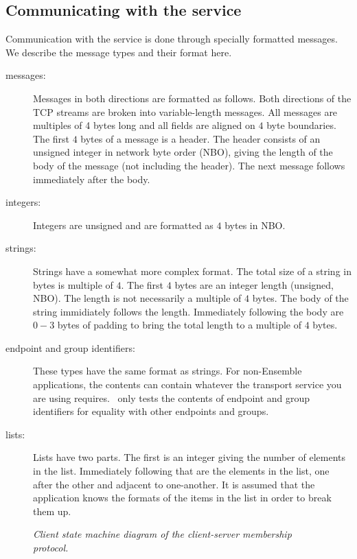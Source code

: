 \subsection{Communicating with the service}
Communication with the service is done through specially formatted
messages.  We describe the message types and their format here.

\begin{description}
\item
[messages:] Messages in both directions are formatted as follows.
Both directions of the TCP streams are broken into variable-length
messages.  All messages are multiples of 4 bytes long and all fields
are aligned on $4$ byte boundaries.  The first $4$ bytes of a message
is a header.  The header consists of an unsigned integer in network
byte order (NBO), giving the length of the body of the message (not
including the header).  The next message follows immediately after
the body.
\item
[integers:] Integers are unsigned and are formatted as $4$ bytes in
NBO.
\item
[strings:] Strings have a somewhat more complex format.  The total
size of a string in bytes is multiple of $4$.  The first $4$ bytes
are an integer length (unsigned, NBO).  The length is not necessarily
a multiple of $4$ bytes.  The body of the string immidiately follows
the length.  Immediately following the body are $0-3$ bytes of
padding to bring the total length to a multiple of $4$ bytes.
\item
[endpoint and group identifiers:] These types have the same format as
strings.  For non-Ensemble applications, the contents can contain
whatever the transport service you are using requires.  \ensemble\
only tests the contents of endpoint and group identifiers for
equality with other endpoints and groups.
\item
[lists:] Lists have two parts.  The first is an integer giving the
number of elements in the list.  Immediately following that are the
elements in the list, one after the other and adjacent to
one-another.  It is assumed that the application knows the formats of
the items in the list in order to break them up.
\end{description}

\begin{figure}[tb]
\begin{center}
\end{center}
\caption{\em Client state machine diagram of the client-server membership protocol.}
\label{fig:state}
\end{figure}

